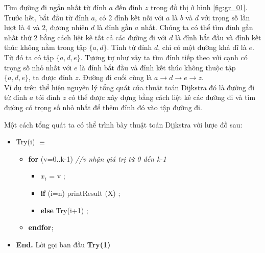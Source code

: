 Tìm đường đi ngắn nhất từ đỉnh $a$ đến đỉnh $z$ trong đồ thị ở hình \ref{fig:gr_01}.\\ 

Trước hết, bắt đầu từ đỉnh $a$, có 2 đỉnh kết nối với $a$ là $b$ và $d$ với trọng số 
lần lượt là $4$ và $2$, đương nhiên $d$ là đỉnh gần $a$ nhất. Chúng ta có thể tìm đỉnh 
gần nhất thứ 2 bằng cách liệt kê tất cả các đường đi với $d$ là đỉnh bắt đầu và đỉnh 
kết thúc không nằm trong tập $\{a, d\}$. Tính từ đỉnh $d$, chỉ có một đường khả dĩ là $e$.
Từ đó ta có tập $\{a, d, e\}$. Tương tự như vậy ta tìm đỉnh tiếp theo với cạnh có trọng số 
nhỏ nhất với $e$ là đỉnh bắt đầu và đỉnh kết thúc không thuộc tập $\{a, d, e\}$, ta được 
đỉnh $z$. Đường đi cuối cùng là $a \to d \to e \to z$. \\

Ví dụ trên thể hiện nguyên lý tổng quát của thuật toán Dijkstra đó là đường đi từ đỉnh $a$
tói đỉnh $z$ có thể được xây dựng bằng cách liệt kê các đường đi và tìm đường có trọng số 
nhỏ nhất để thêm đỉnh đó vào tập đường đi.

Một cách tổng quát ta có thể trình bày thuật toán Dijkstra với lược đồ sau:

\colorbox{mygrey}{\parbox{16cm}{
        \begin{minipage}{16cm}
            \begin{itemize}
                \item [] Try(i) $\equiv$
                    \begin{itemize}
                        \item [] \textbf{for} (v=0..k-1) \textit{//v nhận giá trị từ 0 đến k-1}
                            \begin{itemize}
                                \item [] $x_i$ = v ;
                                \item [] \textbf{if} (i=n) printResult (X) ;
                                \item [] \textbf{else} Try(i+1) ;
                            \end{itemize}
                        \item [] \textbf{endfor};
                    \end{itemize}
                \item [] \enskip \textbf{End.} 
                Lời gọi ban đầu \textbf{Try(1)}
            \end{itemize}
        \end{minipage}
        }
    }
